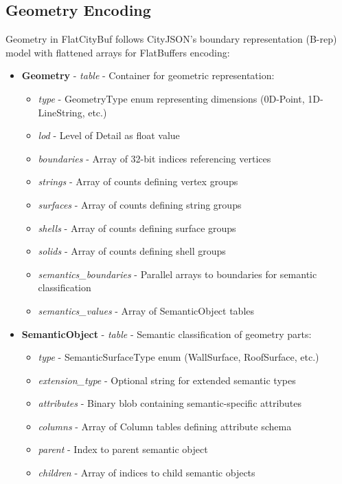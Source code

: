 \subsection{Geometry Encoding}
\label{methodology:feature_encoding:geometry_encoding}

Geometry in FlatCityBuf follows CityJSON's boundary representation (B-rep) model with flattened arrays for FlatBuffers encoding:

\begin{itemize}
  \item \textbf{Geometry} - \textit{table} - Container for geometric representation:
    \begin{itemize}
      \item \textit{type} - GeometryType enum representing dimensions (0D-Point, 1D-LineString, etc.)
      \item \textit{lod} - Level of Detail as float value
      \item \textit{boundaries} - Array of 32-bit indices referencing vertices
      \item \textit{strings} - Array of counts defining vertex groups
      \item \textit{surfaces} - Array of counts defining string groups
      \item \textit{shells} - Array of counts defining surface groups
      \item \textit{solids} - Array of counts defining shell groups
      \item \textit{semantics\_boundaries} - Parallel arrays to boundaries for semantic classification
      \item \textit{semantics\_values} - Array of SemanticObject tables
    \end{itemize}

  \item \textbf{SemanticObject} - \textit{table} - Semantic classification of geometry parts:
    \begin{itemize}
      \item \textit{type} - SemanticSurfaceType enum (WallSurface, RoofSurface, etc.)
      \item \textit{extension\_type} - Optional string for extended semantic types
      \item \textit{attributes} - Binary blob containing semantic-specific attributes
      \item \textit{columns} - Array of Column tables defining attribute schema
      \item \textit{parent} - Index to parent semantic object
      \item \textit{children} - Array of indices to child semantic objects
    \end{itemize}


\end{itemize}

